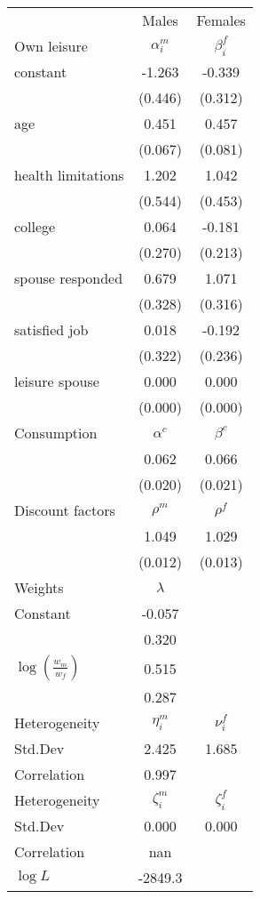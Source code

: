 \begin{tabular}{lcc} 
\hline\hline 
 & Males & Females \\ 
Own leisure & $\alpha_{i}^{m}$ & $\beta_{i}^{f}$ \\ 
constant & -1.263 & -0.339 \\ 
 & (0.446) & (0.312) \\ 
age & 0.451 & 0.457 \\ 
 & (0.067) & (0.081) \\ 
health limitations & 1.202 & 1.042 \\ 
 & (0.544) & (0.453) \\ 
college & 0.064 & -0.181 \\ 
 & (0.270) & (0.213) \\ 
spouse responded & 0.679 & 1.071 \\ 
 & (0.328) & (0.316) \\ 
satisfied job & 0.018 & -0.192 \\ 
 & (0.322) & (0.236) \\ 
leisure spouse & 0.000 & 0.000 \\ 
 & (0.000) & (0.000) \\ 
Consumption & $\alpha^{c}$ & $\beta^{c}$ \\ 
 & 0.062 & 0.066 \\ 
 & (0.020) & (0.021) \\ 
Discount factors & $\rho^m$ & $\rho^f$ \\ 
 & 1.049 & 1.029 \\ 
 & (0.012) & (0.013) \\ 
Weights & $\lambda$ &  \\ 
Constant & -0.057 &  \\ 
 & 0.320 &  \\ 
$\log(\frac{w_m}{w_f})$ & 0.515 &  \\ 
 & 0.287 &  \\ 
Heterogeneity & $\eta_i^m$ & $\nu_i^f$ \\ 
Std.Dev & 2.425 & 1.685 \\ 
Correlation & 0.997 &  \\ 
Heterogeneity & $\zeta_i^m$ & $\zeta_i^f$ \\ 
Std.Dev & 0.000 & 0.000 \\ 
Correlation & nan &  \\ 
\hline 
$\log L$ & -2849.3 & \\ 
\hline \hline 
\end{tabular} 
